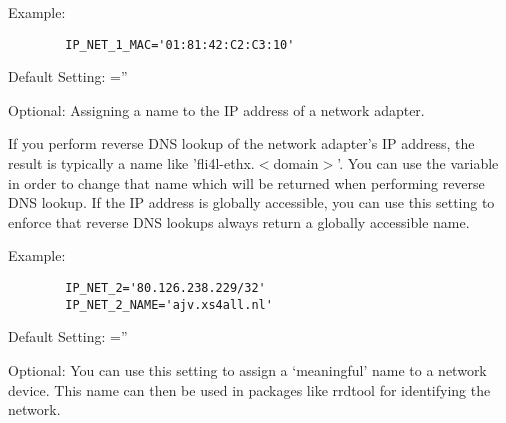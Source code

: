 \begin{description}
{    Example:

  \begin{example}
  \begin{verbatim}
        IP_NET_1_MAC='01:81:42:C2:C3:10'
  \end{verbatim}
  \end{example}
  }


  Default Setting: =''

  {Optional: Assigning a name to the IP address of a network adapter.

    If you perform reverse DNS lookup of the network adapter's IP address, the
    result is typically a name like 'fli4l-ethx.$<$domain$>$'. You can use
    the variable  in order to change that name which will
    be returned when performing reverse DNS lookup. If the IP address is
    globally accessible, you can use this setting to enforce that reverse
    DNS lookups always return a globally accessible name.

    Example:

  \begin{example}
  \begin{verbatim}
        IP_NET_2='80.126.238.229/32'
        IP_NET_2_NAME='ajv.xs4all.nl'
  \end{verbatim}
  \end{example}
  }



  Default Setting: =''
  
  {Optional: You can use this setting to assign a `meaningful' name to a network
  device. This name can then be used in packages like rrdtool for identifying
  the network.
  }
  
\end{description}
